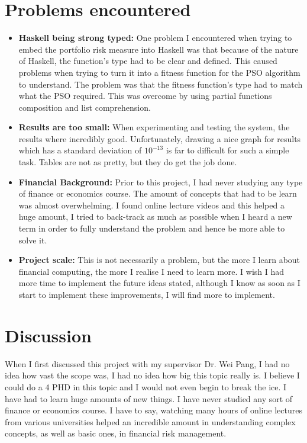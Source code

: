   \section{Problems encountered} %
  \label{sec:problems_encountered}
    \begin{itemize}
      \item \textbf{Haskell being strong typed:} One problem I encountered when trying to embed the portfolio risk measure into Haskell was that because of the nature of Haskell, the function's type had to be clear and defined. This caused problems when trying to turn it into a fitness function for the PSO algorithm to understand. The problem was that the fitness function's type had to match what the PSO required. This was overcome by using partial functions composition and list comprehension. 
      \item \textbf{Results are too small:} When experimenting and testing the system, the results where incredibly good. Unfortunately, drawing a nice graph for results which has a standard deviation of $10^{-13}$ is far to difficult for such a simple task. Tables are not as pretty, but they do get the job done. 
      \item \textbf{Financial Background:} Prior to this project, I had never studying any type of finance or economics course. The amount of concepts that had to be learn was almost overwhelming. I found online lecture videos and this helped a huge amount, I tried to back-track as much as possible when I heard a new term in order to fully understand the problem and hence be more able to solve it.
      \item \textbf{Project scale:} This is not necessarily a problem, but the more I learn about financial computing, the more I realise I need to learn more. I wish I had more time to implement the future ideas stated, although I know as soon as I start to implement these improvements, I will find more to implement.
    \end{itemize}

  \section{Discussion} %
  \label{sec:discussion}
  When I first discussed this project with my supervisor Dr. Wei Pang, I had no idea how vast the scope was, I had no idea how big this topic really is. I believe I could do a 4 PHD in this topic and I would not even begin to break the ice. I have had to learn huge amounts of new things. I have never studied any sort of finance or economics course. I have to say, watching many hours of online lectures from various universities helped an incredible amount in understanding complex concepts, as well as basic ones, in financial risk management.

